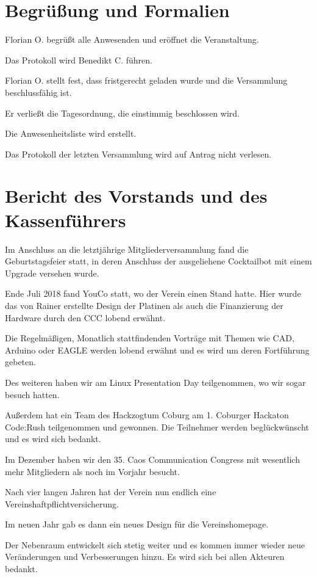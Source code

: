 \section{Begrüßung und Formalien}
Florian O. begrüßt alle Anwesenden und eröffnet die Veranstaltung. 

Das Protokoll wird Benedikt C. führen.

Florian O. stellt fest, dass fristgerecht geladen wurde und die Versammlung beschlussfähig ist. 

Er verließt die Tagesordnung, die einstimmig beschlossen wird.

Die Anwesenheitsliste wird erstellt.

Das Protokoll der letzten Versammlung wird auf Antrag nicht verlesen. 


\section{Bericht des Vorstands und des Kassenführers}
Im Anschluss an die letztjährige Mitgliederversammlung fand die Geburtstagsfeier statt, in deren Anschluss der ausgeliehene Cocktailbot mit einem Upgrade versehen wurde.

Ende Juli 2018 fand YouCo statt, wo der Verein einen Stand hatte. Hier wurde das von Rainer erstellte Design der Platinen als auch die Finanzierung der Hardware durch den CCC lobend erwähnt.

Die Regelmäßigen, Monatlich stattfindenden Vorträge mit Themen wie CAD, Arduino oder EAGLE werden lobend erwähnt und es wird um deren Fortführung gebeten.

Des weiteren haben wir am Linux Presentation Day teilgenommen, wo wir sogar besuch hatten.

Außerdem hat ein Team des Hackzogtum Coburg am 1. Coburger Hackaton Code:Rush teilgenommen und gewonnen. Die Teilnehmer werden beglückwünscht und es wird sich bedankt.

Im Dezember haben wir den 35. Caos Communication Congress mit wesentlich mehr Mitgliedern als noch im Vorjahr besucht.

Nach vier langen Jahren hat der Verein nun endlich eine Vereinshaftpflichtversicherung.

Im neuen Jahr gab es dann ein neues Design für die Vereinshomepage.

Der Nebenraum entwickelt sich stetig weiter und es kommen immer wieder neue Veränderungen und Verbesserungen hinzu. Es wird sich bei allen Akteuren bedankt.

